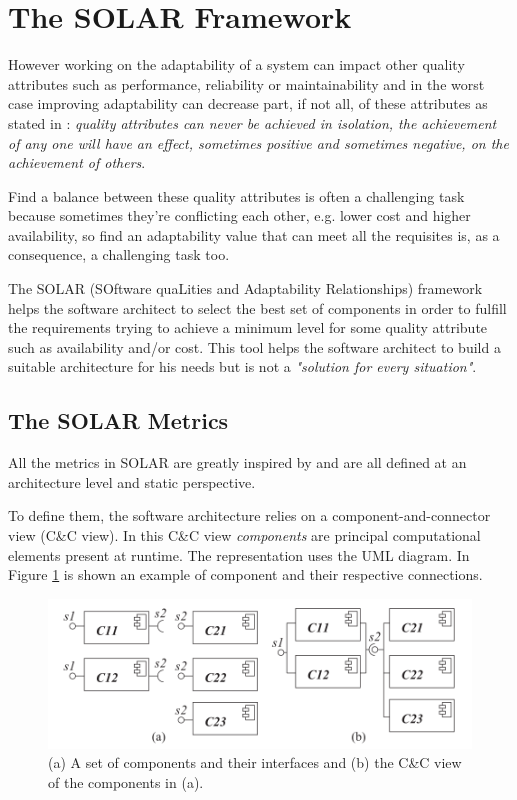 \section{The SOLAR Framework}
However working on the adaptability of a system can impact other quality attributes such as performance, reliability or maintainability and in the worst case improving adaptability can decrease part, if not all, of these attributes as stated in \cite{bass2003software}: \emph{quality attributes can never be achieved in isolation, the achievement of any one will have an effect, sometimes positive and sometimes negative, on the achievement of others}.

Find a balance between these quality attributes is often a challenging task because sometimes they're conflicting each other, e.g. lower cost and higher availability, so find an adaptability value that can meet all the requisites is, as a consequence, a challenging task too.

The SOLAR (SOftware quaLities and Adaptability Relationships) framework \cite{solar} helps the software architect to select the best set of components in order to fulfill the requirements trying to achieve a minimum level for some quality attribute such as availability and/or cost. This tool helps the software architect to build a suitable architecture for his needs but is not a \emph{"solution for every situation"}.

\subsection{The SOLAR Metrics}
All the metrics in SOLAR are greatly inspired by \cite{po-metrics} and are all defined at an architecture level and static perspective. 

To define them, the software architecture relies on a component-and-connector view (C\&C view). In this C\&C view \emph{components} are principal computational elements present at runtime. The representation uses the UML diagram. In Figure \ref{fig:comp-example} is shown an example of component and their respective connections.

\begin{figure}[h]
	\centerline
	{\includegraphics[scale=0.55]{img/solar-comp-example.png}}
	\caption[SOLAR Components example]{(a) A set of components and their interfaces and (b) the C\&C view of the components in (a).\cite{solar}}
	\label{fig:comp-example}
\end{figure}

